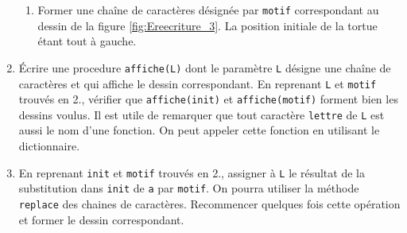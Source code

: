\begin{enumerate}
\begin{enumerate}
\item Former une chaîne de caractères désignée par \verb|motif| correspondant au dessin de la figure \ref{fig:Ereecriture_3}. La position initiale de la tortue étant tout à gauche.
\end{enumerate}

\item \'Ecrire une procedure \verb|affiche(L)| dont le paramètre \verb|L| désigne une chaîne de caractères et qui affiche le dessin correspondant. En reprenant \verb|L| et \verb|motif| trouvés en  2., vérifier que \verb|affiche(init)| et \verb|affiche(motif)| forment bien les dessins voulus. Il est utile de remarquer que tout caractère \verb|lettre| de \verb|L| est aussi le nom d'une fonction. On peut appeler cette fonction en utilisant le dictionnaire.

\item En reprenant \verb|init| et \verb|motif| trouvés en  2., assigner à \verb|L| le résultat de la substitution dans \verb|init| de \verb|a| par \verb|motif|. On pourra utiliser la méthode \verb|replace| des chaines de caractères. Recommencer quelques fois cette opération et former le dessin correspondant.
\end{enumerate}

